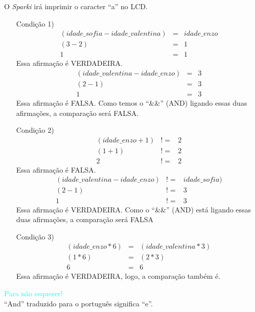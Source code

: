     O \textsl{Sparki} irá imprimir o caracter ``a'' no LCD.
    \begin{itemize}
        \item[Condição 1)]
        \begin{eqnarray}
        (idade\_sofia - idade\_valentina) & = & idade\_enzo\\
        (3 - 2) & = & 1 \nonumber \\
        1 & = & 1 \nonumber
        \end{eqnarray}
        Essa afirmação é VERDADEIRA.
        \begin{eqnarray}
        (idade\_valentina - idade\_enzo) & = & 3\\
        (2 - 1) & = & 3 \nonumber \\
        1 & = & 3 \nonumber
        \end{eqnarray}
        Essa afirmação é FALSA.
        Como temos o ``\&\&'' (AND) ligando essas duas afirmações, a comparação será FALSA.
        \item[Condição 2)] 
        \begin{eqnarray}
        (idade\_enzo + 1) & != & 2\\
        (1 + 1) & != & 2 \nonumber \\
        2 & != & 2 \nonumber
        \end{eqnarray}
        Essa afirmação é FALSA.
        \begin{eqnarray}
        (idade\_valentina - idade\_enzo) & != & idade\_sofia)\\
        (2 - 1) & != & 3 \nonumber \\
        1 & != & 3 \nonumber
        \end{eqnarray}
        Essa afirmação é VERDADEIRA. Como o ``\&\&'' (AND) está ligando essas duas afirmações, a comparação será FALSA
        \item[Condição 3)] 
        \begin{eqnarray}
        (idade\_enzo * 6) & = & (idade\_valentina * 3)\\
        (1 * 6) & = & (2 * 3) \nonumber \\
        6 & = & 6 \nonumber 
        \end{eqnarray}
        Essa afirmação é VERDADEIRA, logo, a comparação também é.
    \end{itemize}
    
    \begin{center}
    \textcolor{cyan}{Para não esquecer!}
    \\``And'' traduzido para o português significa ``e''.
    \end{center}
     
